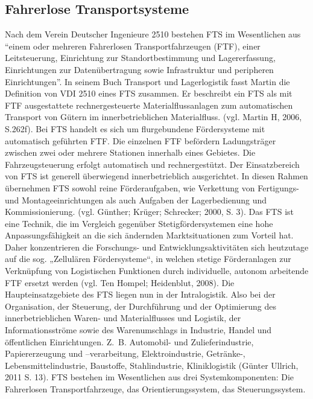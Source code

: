 \begin{itemize}
\subsection{Fahrerlose Transportsysteme}
Nach dem Verein Deutscher Ingenieure 2510 bestehen FTS im Wesentlichen aus "`einem oder mehreren Fahrerlosen Transportfahrzeugen (FTF), einer Leitsteuerung, Einrichtung zur Standortbestimmung und Lagererfassung, Einrichtungen zur Daten\"ubertragung sowie Infrastruktur und peripheren Einrichtungen"'. In seinem Buch Transport und Lagerlogistik fasst Martin die Definition von VDI 2510 eines FTS zusammen. Er beschreibt ein FTS als mit FTF ausgestattete rechnergesteuerte Materialflussanlagen zum automatischen Transport von G\"utern im innerbetrieblichen Materialfluss. (vgl. Martin H, 2006, S.262f). Bei FTS handelt es sich um flurgebundene F\"ordersysteme mit automatisch gef\"uhrten FTF. Die einzelnen FTF bef\"ordern Ladungstr\"ager zwischen zwei oder mehrere Stationen innerhalb eines Gebietes. Die Fahrzeugsteuerung erfolgt automatisch und rechnergest\"utzt. Der Einsatzbereich von FTS ist generell \"uberwiegend innerbetrieblich ausgerichtet. In diesen Rahmen \"ubernehmen FTS sowohl reine F\"orderaufgaben, wie Verkettung von Fertigungs- und Montageeinrichtungen als auch Aufgaben der Lagerbedienung und Kommissionierung. (vgl. G\"unther; Kr\"uger; Schrecker; 2000, S. 3). Das FTS ist eine Technik, die im Vergleich gegen\"uber Stetigf\"ordersystemen eine hohe Anpassungsf\"ahigkeit an die sich \"andernden Marktsituationen zum Vorteil hat. Daher konzentrieren die Forschungs- und Entwicklungsaktivit\"aten sich heutzutage auf die sog. „Zellul\"aren F\"ordersysteme“, in welchen stetige F\"orderanlagen zur Verkn\"upfung von Logistischen Funktionen durch individuelle, autonom arbeitende FTF ersetzt werden (vgl. Ten Hompel; Heidenblut, 2008). Die Haupteinsatzgebiete des FTS liegen nun in der Intralogistik. Also bei der Organisation, der Steuerung, der Durchf\"uhrung und der Optimierung des innerbetrieblichen Waren- und Materialflusses und Logistik, der Informationsstr\"ome sowie des Warenumschlags in Industrie, Handel und \"offentlichen Einrichtungen. Z.~B. Automobil- und Zulieferindustrie, Papiererzeugung und –verarbeitung, Elektroindustrie, Getr\"anke-, Lebensmittelindustrie, Baustoffe, Stahlindustrie, Kliniklogistik (G\"unter Ullrich, 2011 S. 13). FTS bestehen im Wesentlichen aus drei Systemkomponenten: Die Fahrerlosen Transportfahrzeuge, das Orientierungssystem, das Steuerungssystem. 


\end{itemize}
